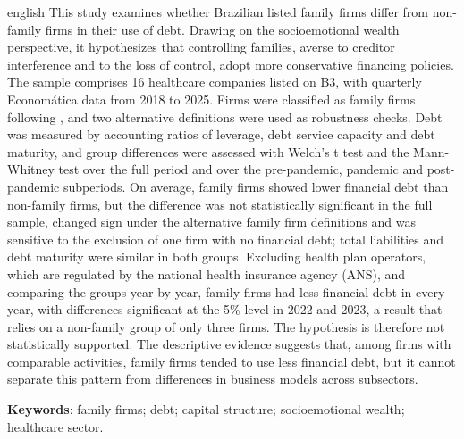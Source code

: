 \begin{resumo}[Abstract]
\begin{otherlanguage*}{english}
This study examines whether Brazilian listed family firms differ from non-family
firms in their use of debt. Drawing on the socioemotional wealth perspective, it
hypothesizes that controlling families, averse to creditor interference and to
the loss of control, adopt more conservative financing policies. The sample
comprises 16 healthcare companies listed on B3, with quarterly Economática data
from 2018 to 2025. Firms were classified as family firms following
, and two alternative definitions were used as robustness
checks. Debt was measured by accounting ratios of leverage, debt service capacity
and debt maturity, and group differences were assessed with Welch's t test and the
Mann-Whitney test over the full period and over the pre-pandemic, pandemic and
post-pandemic subperiods. On average, family firms showed lower financial
debt than non-family firms, but the difference was not statistically significant
in the full sample, changed sign under the alternative family firm definitions and
was sensitive to the exclusion of one firm with no financial debt; total
liabilities and debt maturity were similar in both groups. Excluding health plan
operators, which are regulated by the national health insurance agency (ANS), and
comparing the groups year by year, family firms had less financial debt in every
year, with differences significant at the 5\% level in 2022 and 2023, a result that
relies on a non-family group of only three firms. The hypothesis is therefore not
statistically supported. The descriptive evidence suggests that, among firms with
comparable activities, family firms tended to use less financial debt, but it
cannot separate this pattern from differences in business models across
subsectors.

\vspace{\onelineskip}
\noindent
\textbf{Keywords}: family firms; debt; capital structure; socioemotional wealth;
healthcare sector.
\end{otherlanguage*}
\end{resumo}
